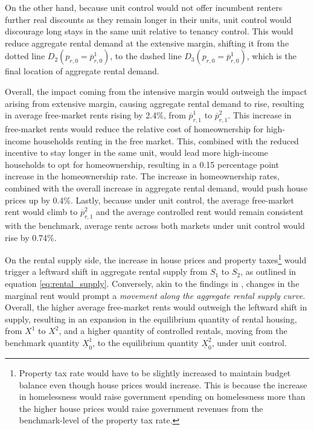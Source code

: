 \documentclass[parskip=full]{article}
\begin{document}
On the other hand, because unit control would not offer incumbent renters further real discounts as they remain longer in their units, unit control would discourage long stays in the same unit relative to tenancy control. This would reduce aggregate rental demand at the extensive margin, shifting it from the dotted line $D_{2}(p_{r,0}=\overline{p}^{1}_{r,0})$, to the dashed line $D_{3}(p_{r,0}=\overline{p}^{1}_{r,0})$, which is the final location of aggregate rental demand.  

Overall, the impact coming from the intensive margin would outweigh the impact arising from extensive margin, causing aggregate rental demand to rise, resulting in average free-market rents rising by 2.4\%, from $\overline{p}^{1}_{r,1}$ to $\overline{p}^{2}_{r,1}$. This increase in free-market rents would reduce the relative cost of homeownership for high-income households renting in the free market. This, combined with the reduced incentive to stay longer in the same unit, would lead more high-income households to opt for homeownership, resulting in a 0.15 percentage point increase in the homeownership rate. The increase in homeownership rates, combined with the overall increase in aggregate rental demand, would push house prices up by 0.4\%. Lastly, because under unit control, the average free-market rent would climb to $\overline{p}^{2}_{r,1}$ and the average controlled rent would remain consistent with the benchmark, average rents across both markets under unit control would rise by 0.74\%.

On the rental supply side, the increase in house prices and property taxes\footnote{Property tax rate would have to be slightly increased to maintain budget balance even though house prices would increase. This is because the increase in homelessness would raise government spending on homelessness more than the higher house prices would raise government revenues from the benchmark-level of the property tax rate.} would trigger a leftward shift in aggregate rental supply from $S_{1}$ to $S_{2}$, as outlined in equation \eqref{eq:rental_supply}. Conversely, akin to the findings in \citet{fallis-1985}, changes in the marginal rent would prompt a \textsl{movement along the aggregate rental supply curve}. Overall, the higher average free-market rents would outweigh the leftward shift in supply, resulting in an expansion in the equilibrium quantity of rental housing, from $X^{1}$ to $X^{2}$, and a higher quantity of controlled rentals, moving from the benchmark quantity $\underline{X}^{1}_{0}$, to the equilibrium quantity $\underline{X}^{2}_{0}$, under unit control. 
\end{document}
